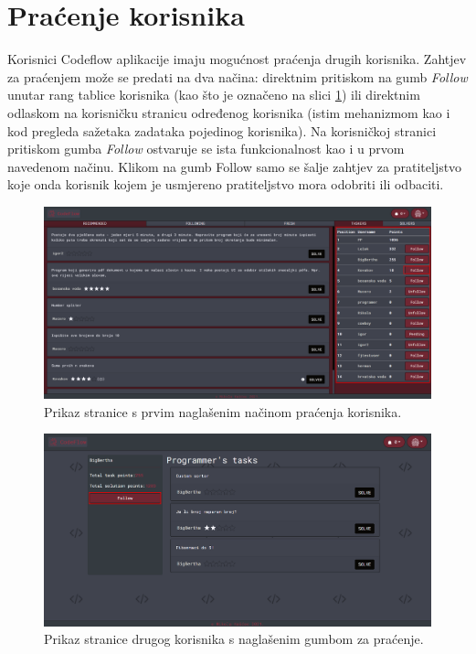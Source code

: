 \documentclass[times, utf8, zavrsni, numeric]{fer}
\begin{document}
		\section{Praćenje korisnika}
		Korisnici Codeflow aplikacije imaju mogućnost praćenja drugih korisnika. Zahtjev za praćenjem može se predati na dva načina: direktnim pritiskom na gumb \textit{Follow} unutar rang tablice korisnika (kao što je označeno na slici \ref{fig:pracenje1}) ili direktnim odlaskom na korisničku stranicu određenog korisnika (istim mehanizmom kao i kod pregleda sažetaka zadataka pojedinog korisnika). Na korisničkoj stranici pritiskom gumba \textit{Follow} ostvaruje se ista funkcionalnost kao i u prvom navedenom načinu. Klikom na gumb Follow samo se šalje zahtjev za pratiteljstvo koje onda korisnik kojem je usmjereno pratiteljstvo mora odobriti ili odbaciti.
		\begin{figure}[H]
			\centering
			\includegraphics[width=\linewidth]{pictures/koristenje/Pracenje1.png}
			\caption{Prikaz stranice s prvim naglašenim načinom praćenja korisnika.}
			\label{fig:pracenje1}
		\end{figure}
		\begin{figure}[H]
			\centering
			\includegraphics[width=\linewidth]{pictures/koristenje/Pracenje2.png}
			\caption{Prikaz stranice drugog korisnika s naglašenim gumbom za praćenje.}
			\label{fig:pracenje2}
		\end{figure}
	
\end{document}
